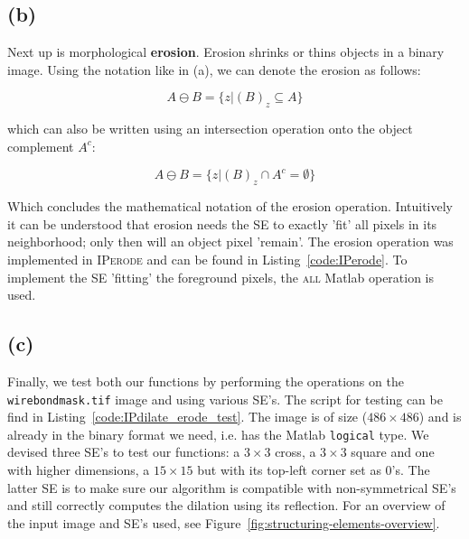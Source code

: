 \documentclass{article}
\begin{document}
\subsection*{(b)}
Next up is morphological \textbf{erosion}. Erosion shrinks or thins objects in a binary image. Using the notation like in (a), we can denote the erosion as follows:

\begin{equation}\label{eq:erosion}
    A \ominus B = \{z|(B)_z \subseteq A \}
\end{equation}

which can also be written using an intersection operation onto the object complement $A^c$:

\begin{equation}\label{eq:erosion-intersection}
    A \ominus B = \{z|(B)_z \cap A^c = \emptyset \}
\end{equation}

Which concludes the mathematical notation of the erosion operation. Intuitively it can be understood that erosion needs the SE to exactly 'fit' all pixels in its neighborhood; only then will an object pixel 'remain'. The erosion operation was implemented in \textsc{IPerode} and can be found in  Listing~\ref{code:IPerode}. To implement the SE 'fitting' the foreground pixels, the \textsc{all} Matlab operation is used.

\subsection*{(c)}
Finally, we test both our functions by performing the operations on the \texttt{wirebondmask.tif} image and using various SE's. The script for testing can be find in  Listing~\ref{code:IPdilate_erode_test}. The image is of size ($486 \times 486$) and is already in the binary format we need, i.e. has the Matlab \texttt{logical} type. We devised three SE's to test our functions: a $3 \times 3$ cross, a $3 \times 3$ square and one with higher dimensions, a $15 \times 15$ but with its top-left corner set as 0's. The latter SE is to make sure our algorithm is compatible with non-symmetrical SE's and still correctly computes the dilation using its reflection. For an overview of the input image and SE's used, see Figure~\ref{fig:structuring-elements-overview}.
\end{document}

